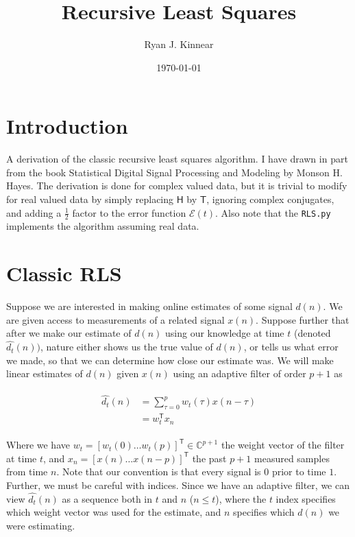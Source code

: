 \documentclass[a4paper, 12pt]{article}
\author{Ryan J. Kinnear}
\title{Recursive Least Squares}
\date{\today}
\def\T{\mathsf{T}}
\def\H{\mathsf{H}}
\begin{document}
\maketitle

\section{Introduction}
A derivation of the classic recursive least squares algorithm.  I have drawn in part from the book Statistical Digital Signal Processing and Modeling by Monson H. Hayes.  The derivation is done for complex valued data, but it is trivial to modify for real valued data by simply replacing $\H$ by $\T$, ignoring complex conjugates, and adding a $\frac{1}{2}$ factor to the error function $\mathcal{E}(t)$.  Also note that the \texttt{RLS.py} implements the algorithm assuming real data.

\section{Classic RLS}
Suppose we are interested in making online estimates of some signal $d(n)$.  We are given access to measurements of a related signal $x(n)$.  Suppose further that after we make our estimate of $d(n)$ using our knowledge at time $t$ (denoted $\hat{d_t}(n))$, nature either shows us the true value of $d(n)$, or tells us what error we made, so that we can determine how close our estimate was.  We will make linear estimates of $d(n)$ given $x(n)$ using an adaptive filter of order $p + 1$ as

\begin{align}
\begin{split}
\label{eq:prediction}
  \hat{d_t}(n) &= \sum_{\tau = 0}^{p}w_t(\tau)x(n - \tau) \\
  &= w_t^\T x_n
\end{split}
\end{align}

Where we have $w_t = [w_t(0) \ldots w_t(p)]^\T \in \mathbb{C}^{p + 1}$ the weight vector of the filter at time $t$, and $x_n = [x(n) \ldots x(n - p)]^\T$ the past $p + 1$ measured samples from time $n$.  Note that our convention is that every signal is $0$ prior to time $1$.  Further, we must be careful with indices.  Since we have an adaptive filter, we can view $\hat{d_t}(n)$ as a sequence both in $t$ and $n$ ($ n \le t$), where the $t$ index specifies which weight vector was used for the estimate, and $n$ specifies which $d(n)$ we were estimating.
\end{document}
